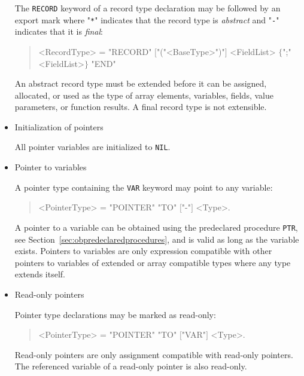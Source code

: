 \begin{itemize}
The \texttt{RECORD} keyword of a record type declaration may be followed by an export mark where "\texttt{*}" indicates that the record type is \emph{abstract} and "\texttt{-}" indicates that it is \emph{final}:

\begin{quote}\begin{grammar}
<RecordType> = "RECORD" \changed{$[$"*"$\mid$"-"$]$} $[$"("<BaseType>")"$]$ <FieldList> $\{$";" <FieldList>$\}$ "END" \par
\end{grammar}\end{quote}

An abstract record type must be extended before it can be assigned, allocated, or used as the type of array elements, variables, fields, value parameters, or function results.
A final record type is not extensible.

\item Initialization of pointers

All pointer variables are initialized to \texttt{NIL}.

\item Pointer to variables

A pointer type containing the \texttt{VAR} keyword may point to any variable:

\begin{quote}\begin{grammar}
<PointerType> = "POINTER" "TO" \changed{$[$"VAR"$]$} $[$"-"$]$ <Type>.
\end{grammar}\end{quote}

A pointer to a variable can be obtained using the predeclared procedure \texttt{PTR}, see Section~\ref{sec:obpredeclaredprocedures}, and is valid as long as the variable exists.
Pointers to variables are only expression compatible with other pointers to variables of extended or array compatible types where any type extends itself.

\item Read-only pointers

Pointer type declarations may be marked as read-only:

\begin{quote}\begin{grammar}
<PointerType> = "POINTER" "TO" $[$"VAR"$]$ \changed{$[$"-"$]$} <Type>.
\end{grammar}\end{quote}

Read-only pointers are only assignment compatible with read-only pointers.
The referenced variable of a read-only pointer is also read-only.

\end{itemize}

